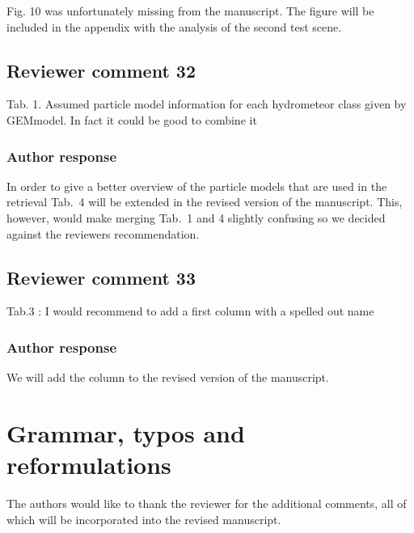 \documentclass[11pt]{scrartcl}
\begin{document}
Fig. 10 was unfortunately missing from the manuscript. The figure will be included in the appendix
with the analysis of the second test scene.

\subsection*{Reviewer comment 32}

Tab. 1. Assumed particle model information for each hydrometeor class given by GEMmodel. In fact it could be good to combine it

\subsubsection*{Author response}

In order to give a better overview of the particle models that are used
in the retrieval Tab.~4 will be extended in the revised version of the
manuscript.  This, however, would make merging Tab.~1 and 4 slightly confusing
so we decided against the reviewers recommendation.

\subsection*{Reviewer comment 33}

Tab.3 : I would recommend to add a first column with a spelled out name

\subsubsection*{Author response}

We will add the column to the revised version of the manuscript.

\section*{Grammar, typos and reformulations}

The authors would like to thank the reviewer for the additional comments, all of
which will be incorporated into the revised manuscript.



\end{document}
